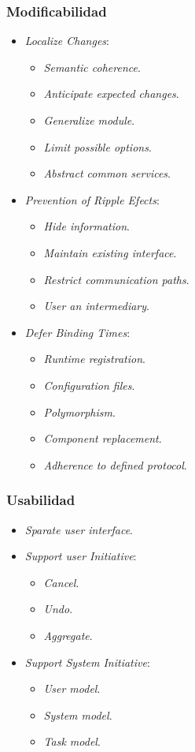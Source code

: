 \documentclass[]{article}
\begin{document}
\subsubsection{Modificabilidad}
\begin{itemize}
    \item \emph{Localize Changes}:
    \begin{itemize}
        \item \emph{Semantic coherence}.
        \item \emph{Anticipate expected changes}.
        \item \emph{Generalize module}.
        \item \emph{Limit possible options}.
        \item \emph{Abstract common services}.
    \end{itemize}
    \item \emph{Prevention of Ripple Efects}:
    \begin{itemize}
        \item \emph{Hide information}.
        \item \emph{Maintain existing interface}.
        \item \emph{Restrict communication paths}.
        \item \emph{User an intermediary}.
    \end{itemize}
    \item \emph{Defer Binding Times}:
    \begin{itemize}
        \item \emph{Runtime registration}.
        \item \emph{Configuration files}.
        \item \emph{Polymorphism}.
        \item \emph{Component replacement}.
        \item \emph{Adherence to defined protocol}.
    \end{itemize}
\end{itemize}

\subsubsection{Usabilidad}
\begin{itemize}
    \item \emph{Sparate user interface}.
    \item \emph{Support user Initiative}:
    \begin{itemize}
        \item \emph{Cancel}.
        \item \emph{Undo}.
        \item \emph{Aggregate}.
    \end{itemize}
    \item \emph{Support System Initiative}:
    \begin{itemize}
        \item \emph{User model}.
        \item \emph{System model}.
        \item \emph{Task model}.
    \end{itemize}
\end{itemize}
\end{document}
